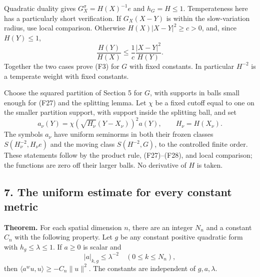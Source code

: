 \documentclass[
  11pt,
]{article}
\makeatletter
\let\ReaderOriginalAnchorStart\hyper@anchorstart
\let\ReaderOriginalAnchorEnd\hyper@anchorend
\let\ReaderPendingAliases\@empty
\def\ReaderArmAliases#1{\gdef\ReaderPendingAliases{#1}}
\def\hyper@anchorstart#1{\ReaderIfNativeAnchorTF{#1}{\ReaderPendingAliases\global\let\ReaderPendingAliases\@empty}{}\ReaderOriginalAnchorStart{#1}}
\makeatother
\begin{document}
Quadratic duality gives \(G_X^\sigma=H(X)^{-1}e\) and \(h_G=H\leq1\).
Temperateness here has a particularly short verification. If
\(G_X(X-Y)\) is within the slow-variation radius, use local comparison.
Otherwise \(H(X)|X-Y|^2\geq c>0\), and, since \(H(Y)\leq1\), \[
\frac{H(Y)}{H(X)}
\leq\frac1c\frac{|X-Y|^2}{H(Y)}.
\tag{F29}
\] Together the two cases prove (F3) for \(G\) with fixed constants. In
particular \(H^{-2}\) is a temperate weight with fixed constants.

Choose the squared partition of Section 5 for \(G\), with supports in
balls small enough for (F27) and the splitting lemma. Let \(\chi\) be a
fixed cutoff equal to one on the smaller partition support, with support
inside the splitting ball, and set \[
a_\nu(Y)=\chi(\sqrt{H_\nu}(Y-X_\nu))^2a(Y),
\qquad H_\nu=H(X_\nu).
\tag{F30}
\] The symbols \(a_\nu\) have uniform seminorms in both their frozen
classes \(S(H_\nu^{-2},H_\nu e)\) and the moving class \(S(H^{-2},G)\),
to the controlled finite order. These statements follow by the product
rule, (F27)--(F28), and local comparison; the functions are zero off
their larger balls. No derivative of \(H\) is taken.

\ReaderArmAliases{\ReaderOriginalAnchorStart{AN03-SFP-007}\ReaderOriginalAnchorEnd\begingroup\expandafter\def\csname @currentHref\endcsname{AN03-SFP-007}\label{AN03-SFP-007}\endgroup\ReaderOriginalAnchorStart{an03-sfp-007-the-uniform-estimate-for-every-constant-metric}\ReaderOriginalAnchorEnd\begingroup\expandafter\def\csname @currentHref\endcsname{an03-sfp-007-the-uniform-estimate-for-every-constant-metric}\label{an03-sfp-007-the-uniform-estimate-for-every-constant-metric}\endgroup\ReaderOriginalAnchorStart{7-the-uniform-estimate-for-every-constant-metric}\ReaderOriginalAnchorEnd\begingroup\expandafter\def\csname @currentHref\endcsname{7-the-uniform-estimate-for-every-constant-metric}\label{7-the-uniform-estimate-for-every-constant-metric}\endgroup\ReaderOriginalAnchorStart{the-uniform-estimate-for-every-constant-metric}\ReaderOriginalAnchorEnd}
\subsection{7. The uniform estimate for every constant
metric}\label{the-uniform-estimate-for-every-constant-metric}

\textbf{Theorem.} For each spatial dimension \(n\), there are an integer
\(N_n\) and a constant \(C_n\) with the following property. Let \(g\) be
any constant positive quadratic form with \(h_g\leq\lambda\leq1\). If
\(a\geq0\) is scalar and \[
|a|_{k,g}\leq\lambda^{-2}\quad(0\leq k\leq N_n),
\tag{F31}
\] then \(\langle a^wu,u\rangle\geq-C_n\|u\|^2\). The constants are
independent of \(g,a,\lambda\).
\end{document}
